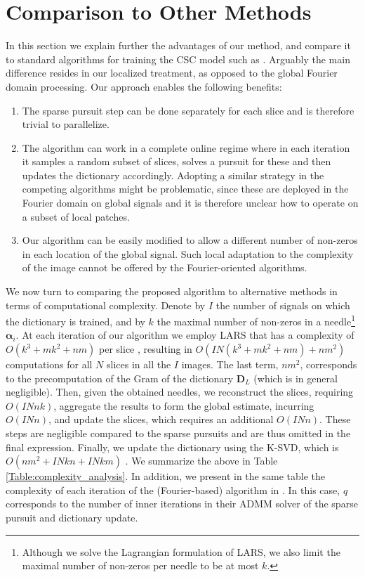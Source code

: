 \documentclass[10pt,twocolumn,letterpaper]{article}
\def\D{{\mathbf D}}
\def\alfa{{\boldsymbol \alpha}}
\begin{document}
\section{Comparison to Other Methods} \label{Sec:other_methods}
In this section we explain further the advantages of our method, and compare it to standard algorithms for training the CSC model such as \cite{Heide2015,wohlberg2016boundary}. Arguably the main difference resides in our localized treatment, as opposed to the global Fourier domain processing. Our approach enables the following benefits:
\begin{enumerate}
\item The sparse pursuit step can be done separately for each slice and is therefore trivial to parallelize.
\item The algorithm can work in a complete online regime where in each iteration it samples a random subset of slices, solves a pursuit for these and then updates the dictionary accordingly. Adopting a similar strategy in the competing algorithms \cite{Heide2015,wohlberg2016boundary} might be problematic, since these are deployed in the Fourier domain on global signals and it is therefore unclear how to operate on a subset of local patches.
\item Our algorithm can be easily modified to allow a different number of non-zeros in each location of the global signal. Such local adaptation to the complexity of the image cannot be offered by the Fourier-oriented algorithms. 
\end{enumerate}

We now turn to comparing the proposed algorithm to alternative methods in terms of computational complexity. Denote by $I$ the number of signals on which the dictionary is trained, and by $k$ the maximal number of non-zeros in a needle\footnote{Although we solve the Lagrangian formulation of LARS, we also limit the maximal number of non-zeros per needle to be at most $k$.} $\alfa_i$. At each iteration of our algorithm we employ LARS that has a complexity of $O( k^3 + m k^2 + n m )$ per slice \cite{mairal2014sparse}, resulting in $O( IN(k^3 + m k^2 + n m) + n m^2 )$ computations for all $N$ slices in all the $I$ images. The last term, $n m^2$, corresponds to the precomputation of the Gram of the dictionary $\D_L$ (which is in general negligible). Then, given the obtained needles, we reconstruct the slices, requiring $O( IN n k )$, aggregate the results to form the global estimate, incurring $O( IN n )$, and update the slices, which requires an additional $O( IN n )$. These steps are negligible compared to the sparse pursuits and are thus omitted in the final expression. Finally, we update the dictionary using the K-SVD, which is $O( n m^2 + I N k n + I N k m )$ \cite{rubinstein2008efficient}. We summarize the above in Table \ref{Table:complexity_analysis}. In addition, we present in the same table the complexity of each iteration of the (Fourier-based) algorithm in \cite{Heide2015}. In this case, $q$ corresponds to the number of inner iterations in their ADMM solver of the sparse pursuit and dictionary update.
\end{document}
